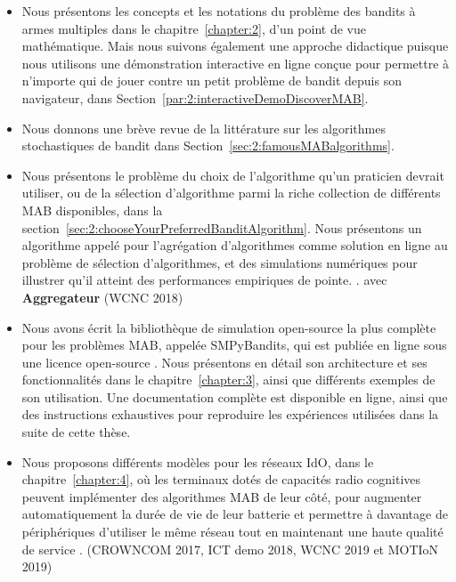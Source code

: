 \begin{resume_fr}
\begin{itemize}
    \item
    Nous présentons les concepts et les notations du problème des bandits à armes multiples dans le chapitre~\ref{chapter:2}, d'un point de vue mathématique.
    Mais nous suivons également une approche didactique puisque nous utilisons une démonstration interactive en ligne conçue pour permettre à n'importe qui de jouer contre un petit problème de bandit depuis son navigateur, dans Section~\ref{par:2:interactiveDemoDiscoverMAB}.

    \item
    Nous donnons une brève revue de la littérature sur les algorithmes stochastiques de bandit dans Section~\ref{sec:2:famousMABalgorithms}.

    \item
    Nous présentons le problème du choix de l'algorithme qu'un praticien devrait utiliser, ou de la sélection d'algorithme parmi la riche collection de différents MAB disponibles, dans la section~\ref{sec:2:chooseYourPreferredBanditAlgorithm}.
    Nous présentons un algorithme appelé \Aggr{} pour l'agrégation d'algorithmes comme solution en ligne au problème de sélection d'algorithmes, et des simulations numériques pour illustrer qu'il atteint des performances empiriques de pointe.
    \cite{Besson2018WCNC}.
    avec \textbf{Aggregateur} (WCNC 2018)

    \item
    Nous avons écrit la bibliothèque de simulation open-source la plus complète pour les problèmes MAB, appelée SMPyBandits, qui est publiée en ligne sous une licence open-source \cite{SMPyBandits,SMPyBanditsJMLR}.
    Nous présentons en détail son architecture et ses fonctionnalités dans le chapitre~\ref{chapter:3}, ainsi que différents exemples de son utilisation.
    Une documentation complète est disponible en ligne, ainsi que des instructions exhaustives pour reproduire les expériences utilisées dans la suite de cette thèse.

    \item
    Nous proposons différents modèles pour les réseaux IdO, dans le chapitre~\ref{chapter:4}, où les terminaux dotés de capacités radio cognitives peuvent implémenter des algorithmes MAB de leur côté, pour augmenter automatiquement la durée de vie de leur batterie et permettre à davantage de périphériques d'utiliser le même réseau tout en maintenant une haute qualité de service
    \cite{Bonnefoi17,Besson2019WCNC,Bonnefoi2019WCNC}.
    (CROWNCOM 2017, ICT demo 2018, WCNC 2019 et MOTIoN 2019)


\end{itemize}
\end{resume_fr}
